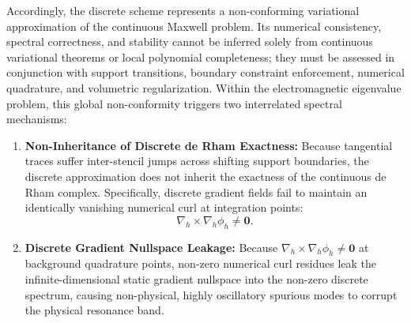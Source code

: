 \documentclass[preprint,12pt]{elsarticle}
\begin{document}
Accordingly, the discrete scheme represents a non-conforming variational approximation of the continuous Maxwell problem. Its numerical consistency, spectral correctness, and stability cannot be inferred solely from continuous variational theorems or local polynomial completeness; they must be assessed in conjunction with support transitions, boundary constraint enforcement, numerical quadrature, and volumetric regularization. Within the electromagnetic eigenvalue problem, this global non-conformity triggers two interrelated spectral mechanisms:
\begin{enumerate}
    \item \textbf{Non-Inheritance of Discrete de Rham Exactness:} Because tangential traces suffer inter-stencil jumps across shifting support boundaries, the discrete approximation does not inherit the exactness of the continuous de Rham complex. Specifically, discrete gradient fields fail to maintain an identically vanishing numerical curl at integration points:
          \begin{equation}
              \nabla_h \times \nabla_h \phi_h \neq \mathbf{0}.
              \label{eq:grad_curl_nonvanishing}
          \end{equation}
    \item \textbf{Discrete Gradient Nullspace Leakage:} Because $\nabla_h \times \nabla_h \phi_h \neq \mathbf{0}$ at background quadrature points, non-zero numerical curl residues leak the infinite-dimensional static gradient nullspace into the non-zero discrete spectrum, causing non-physical, highly oscillatory spurious modes to corrupt the physical resonance band.
\end{enumerate}
\end{document}
